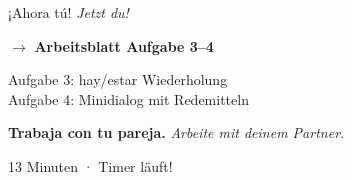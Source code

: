 \documentclass[aspectratio=169, 11pt]{beamer}
\newcommand{\seriftext}[1]{{\fontfamily{ppl}\selectfont #1}}
\newcommand{\es}[1]{\seriftext{\textbf{#1}}}
\newcommand{\de}[1]{\textit{\textcolor{mittelgrau}{#1}}}
\newcommand{\abmark}[1]{{\Large$\rightarrow$ \textbf{Arbeitsblatt Aufgabe #1}}}
\newcommand{\zeit}[1]{{\small\textcolor{mittelgrau}{#1}}}
\begin{document}
\begin{frame}{¡Ahora tú! \de{Jetzt du!}}
    \vspace{1cm}

    \begin{center}
        \abmark{3--4}

        \vspace{0.8cm}

        {\large Aufgabe 3: hay/estar Wiederholung}\\
        {\large Aufgabe 4: Minidialog mit Redemitteln}

        \vspace{0.8cm}

        \es{Trabaja con tu pareja.} \de{Arbeite mit deinem Partner.}

        \vspace{0.5cm}

        \zeit{13 Minuten · Timer läuft!}
    \end{center}
\end{frame}

\end{document}
